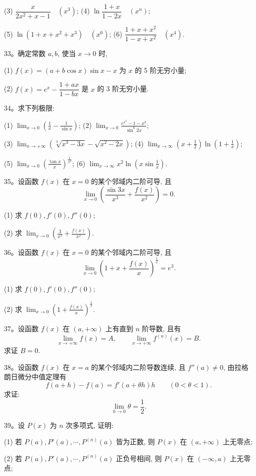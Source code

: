 (3) $\dfrac{x}{2x^2+x-1}\quad (x^3)$;\qquad
(4) $\ln\dfrac{1+x}{1-2x}\quad (x^n)$;

(5) $\ln(1+x+x^2+x^3)\quad (x^6)$;\qquad
(6) $\dfrac{1+x+x^2}{1-x+x^2}\quad (x^4)$.

33。确定常数 $a,b$, 使当 $x\to0$ 时,

(1) $f(x)=(a+b\cos x)\sin x-x$ 为 $x$ 的 5 阶无穷小量;

(2) $f(x)=e^x-\dfrac{1+ax}{1-bx}$ 是 $x$ 的 3 阶无穷小量.

34。求下列极限:

(1) $\displaystyle\lim_{x\to0}\left(\frac1x-\frac1{\sin x}\right)$;\qquad
(2) $\displaystyle\lim_{x\to0}\frac{e^{x^3}-1-x^3}{\sin^6 2x}$;

(3) $\displaystyle\lim_{x\to+\infty}\left(\sqrt[3]{x^3-3x}-\sqrt{x^2-2x}\right)$;\qquad
(4) $\displaystyle\lim_{x\to\infty}\left(x+\frac12\right)\ln\left(1+\frac1x\right)$;

(5) $\displaystyle\lim_{x\to0}\left(\frac{\tan x}{x}\right)^{\frac1{x^2}}$;\qquad
(6) $\displaystyle\lim_{x\to\infty}x^2\ln\left(x\sin\frac1x\right)$.

35。设函数 $f(x)$ 在 $x=0$ 的某个邻域内二阶可导, 且
\[
  \lim_{x\to0}\left(\frac{\sin3x}{x^3}+\frac{f(x)}{x^2}\right)=0.
\]

(1) 求 $f(0),f'(0),f''(0)$;

(2) 求 $\displaystyle\lim_{x\to0}\left(\frac3{x^2}+\frac{f(x)}{x^2}\right)$.

36。设函数 $f(x)$ 在 $x=0$ 的某个邻域内二阶可导, 且
\[
  \lim_{x\to0}\left(1+x+\frac{f(x)}x\right)^{\frac1x}=e^3.
\]

(1) 求 $f(0),f'(0),f''(0)$;

(2) 求 $\displaystyle\lim_{x\to0}\left(1+\frac{f(x)}x\right)^{\frac1x}$.

37。设函数 $f(x)$ 在 $(a,+\infty)$ 上有直到 $n$ 阶导数, 且有
\[
  \lim_{x\to+\infty}f(x)=A,\qquad
  \lim_{x\to+\infty}f^{(n)}(x)=B.
\]
求证 $B=0$.

38。设函数 $f(x)$ 在 $x=a$ 的某个邻域内二阶导数连续, 且 $f''(a)\ne0$, 由拉格朗日微分中值定理有
\[
  f(a+h)-f(a)=f'(a+\theta h)h\qquad (0<\theta<1).
\]
求证:
\[
  \lim_{h\to0}\theta=\frac12.
\]

39。设 $P(x)$ 为 $n$ 次多项式, 证明:

(1) 若 $P(a),P'(a),\cdots,P^{(n)}(a)$ 皆为正数, 则 $P(x)$ 在 $(a,+\infty)$ 上无零点;

(2) 若 $P(a),P'(a),\cdots,P^{(n)}(a)$ 正负号相间, 则 $P(x)$ 在 $(-\infty,a)$ 上无零点;

